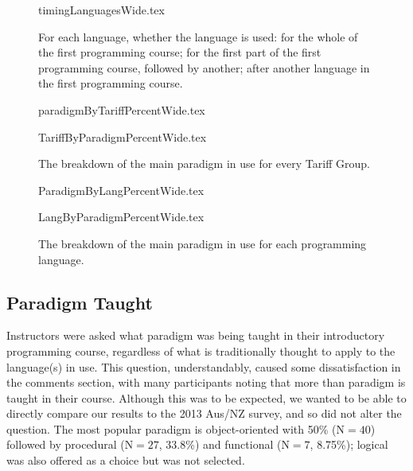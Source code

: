 \documentclass[a4paper,11pt]{article}
\begin{document}
\begin{figure}[ht]
\begin{center}
{timingLanguagesWide.tex}
\end{center}
\caption{For each language, whether the language is used: for the whole of the first programming course; for the first part of the first programming course, followed by another; after another language in the first programming course.
\label{fig:timing}}
\end{figure}




\begin{figure}[ht]
\begin{center}
{paradigmByTariffPercentWide.tex}
\end{center}
\begin{center}
{TariffByParadigmPercentWide.tex}
\end{center}
\caption{The breakdown of the main paradigm in use for every Tariff Group.\label{fig:paradigmTariff}}
\end{figure}

\begin{figure}[ht]
\begin{center}
{ParadigmByLangPercentWide.tex}
\end{center}
\begin{center}
{LangByParadigmPercentWide.tex}
\end{center}
\caption{The breakdown of the main paradigm in use for each programming language.\label{fig:paradigmLang}}
\end{figure}
\subsection{Paradigm Taught}

Instructors were asked what paradigm was being taught in their
introductory programming course, regardless of what is traditionally
thought to apply to the language(s) in use. This question,
understandably, caused some dissatisfaction in the comments section,
with many participants noting that more than paradigm is taught in
their course. Although this was to be expected, we wanted to be able
to directly compare our results to the 2013 Aus/NZ survey, and so did
not alter the question. The most popular paradigm is object-oriented
with 50\% ($\mathrm{N}=40$) followed by procedural ($\mathrm{N}=27$,
33.8\%) and functional ($\mathrm{N}=7$, 8.75\%); logical was also
offered as a choice but was not selected.
\end{document}

